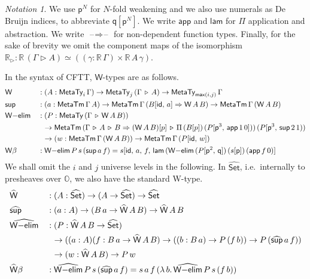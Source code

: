 \documentclass[acmsmall]{acmart}
\newcommand{\mit}[1]{{\mathsf{#1}}}
\newcommand{\msf}[1]{{\mathsf{#1}}}
\newcommand{\mbb}[1]{\mathbb{#1}}
\newcommand{\p}{\mathsf{p}}
\newcommand{\q}{\mathsf{q}}
\newcommand{\wh}[1]{\widehat{#1}}
\newcommand{\whset}{\wh{\Set}}
\newcommand{\re}{\mbb{R}}
\newcommand{\mbbo}{\mbb{O}}
\newcommand{\vW}{\mathsf{W}}
\newcommand{\vsup}{\mathsf{sup}}
\newcommand{\vid}{\mathsf{id}}
\newcommand{\Set}{\msf{Set}}
\newcommand{\ext}{\triangleright}
\newcommand{\MTy}{\msf{MetaTy}}
\newcommand{\MTm}{\msf{MetaTm}}
\newcommand{\blank}{{\mathord{\hspace{1pt}\text{--}\hspace{1pt}}}}
\theoremstyle{remark}
\newtheorem{notation}{Notation}
\newcommand{\id}{\mit{id}}
\begin{document}
\begin{notation} We use $\p^N$ for $N$-fold
weakening and we also use numerals as De Bruijn indices, to abbreviate
$\q[\p^N]$. We write $\msf{app}$ and $\msf{lam}$ for $\Pi$ application and
abstraction. We write $\blank{\Rightarrow}\blank$ for non-dependent function
types. Finally, for the sake of brevity we omit the component maps of the isomorphism
$\re_\ext : \re\,(\Gamma \ext A) \simeq ((\gamma : \re\,\Gamma) \times \re\,A\,\gamma)$.
\end{notation}

In the syntax of CFTT, $\vW$-types are as follows.
\begin{alignat*}{3}
  &\vW   &&: (A : \MTy_i\,\Gamma) \to \MTy_j\,(\Gamma\,\ext\,A) \to \MTy_{\msf{max}(i,j)}\,\Gamma\\
  &\vsup &&: (a : \MTm\,\Gamma\,A) \to \MTm\,\Gamma\,(B[\vid,\,a] \Rightarrow \vW\,A\,B) \to \MTm\,\Gamma\,(\vW\,A\,B)\\
  &\vW{-}\msf{elim}  &&: (P : \MTy\,(\Gamma\,\ext\,\vW\,A\,B))\\
  &                  && \hspace{0.6em}\to \MTm\,(\Gamma\,\ext\,A\,\ext\,B \Rightarrow (\vW\,A\,B)[p]\,\ext\,\Pi\,(B[p])\,(P[\p^3,\,\msf{app}\,1\,0]))\,(P[\p^3,\,\vsup\,2\,1))\\
  &                  && \hspace{0.6em}\to (w : \MTm\,\Gamma\,(\vW\,A\,B)) \to \MTm\,\Gamma\,(P[\id,\,w])\\
  & \vW{\beta}       &&:
    \vW{-}\msf{elim}\,P\,s\,(\vsup\,a\,f) = s[\id,\,a,\,f,\,\msf{lam}\,(\vW{-}\msf{elim}\,(P[\p^2,\,\q])\,(s[\p])\,(\msf{app}\,f\,0)]
\end{alignat*}
We shall omit the $i$ and $j$ universe levels in the following. In $\whset$,
i.e.\ internally to presheaves over $\mbbo$, we also have the standard W-type.
\begin{alignat*}{3}
  & \wh{\vW}   &&: (A : \whset) \to (A \to \whset) \to \whset\\
  & \wh{\vsup} &&: (a : A) \to (B\,a \to \wh{\vW}\,A\,B) \to \wh{\vW}\,A\,B\\
  & \wh{\vW{-}\msf{elim}} &&: (P : \wh{\vW}\,A\,B \to \whset)\\
  & && \hspace{0.6em}\to ((a : A)(f : B\,a \to \wh{\vW}\,A\,B) \to ((b : B\,a) \to P\,(f\,b)) \to P\,(\wh{\vsup}\,a\,f))\\
  & && \hspace{0.6em}\to (w : \wh{\vW}\,A\,B) \to P\,w\\
  & \wh{\vW}{\beta} &&: \wh{\vW{-}\msf{elim}}\,P\,s\,(\wh{\vsup}\,a\,f) = s\,a\,f\,(\lambda\,b.\,\wh{\vW{-}\msf{elim}}\,P\,s\,(f\,b))
\end{alignat*}
\end{document}
